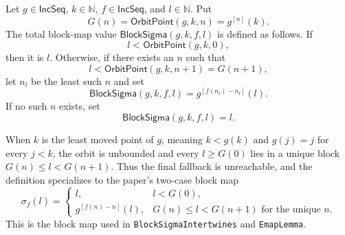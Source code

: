\begin{definition}
Let $g\in\mathsf{IncSeq}$, $k\in\mathbb N$, $f\in\mathsf{IncSeq}$, and
$l\in\mathbb N$.  Put
\[
G(n)=\mathsf{OrbitPoint}(g,k,n)=g^{[n]}(k).
\]
The total block-map value $\mathsf{BlockSigma}(g,k,f,l)$ is defined as
follows.  If
\[
l<\mathsf{OrbitPoint}(g,k,0),
\]
then it is $l$.  Otherwise, if there exists an $n$ such that
\[
l<\mathsf{OrbitPoint}(g,k,n+1)=G(n+1),
\]
let $n_l$ be the least such $n$ and set
\[
\mathsf{BlockSigma}(g,k,f,l)=g^{[f(n_l)-n_l]}(l).
\]
If no such $n$ exists, set
\[
\mathsf{BlockSigma}(g,k,f,l)=l.
\]

When $k$ is the least moved point of $g$, meaning
$k<g(k)$ and $g(j)=j$ for every $j<k$, the orbit is unbounded and every
$l\geq G(0)$ lies in a unique block $G(n)\leq l<G(n+1)$.  Thus the final
fallback is unreachable, and the definition specializes to the paper's
two-case block map
\[
\sigma_f(l)=
\begin{cases}
l,&l<G(0),\\
g^{[f(n)-n]}(l),&G(n)\leq l<G(n+1)\text{ for the unique }n.
\end{cases}
\]
This is the block map used in \texttt{BlockSigmaIntertwines} and
\texttt{EmapLemma}.
\end{definition}
